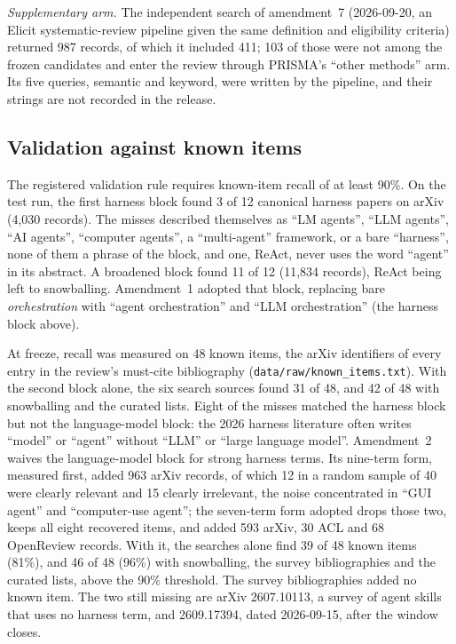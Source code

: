 \emph{Supplementary arm.} The independent search of amendment~7 (2026-09-20, an Elicit
systematic-review pipeline given the same definition and eligibility criteria) returned 987 records,
of which it included 411; 103 of those were not among the frozen candidates and enter the review
through PRISMA's ``other methods'' arm. Its five queries, semantic and keyword, were written by the
pipeline, and their strings are not recorded in the release.

\subsection{Validation against known items}
\label{subsec:search-validation}

The registered validation rule requires known-item recall of at least 90\%. On the test run, the
first harness block found 3 of 12 canonical harness papers on arXiv (4,030 records). The misses
described themselves as ``LM agents'', ``LLM agents'', ``AI agents'', ``computer agents'', a
``multi-agent'' framework, or a bare ``harness'', none of them a phrase of the block, and one, ReAct,
never uses the word ``agent'' in its abstract. A broadened block found 11 of 12 (11,834 records), ReAct
being left to snowballing. Amendment~1 adopted that block, replacing bare \emph{orchestration} with
``agent orchestration'' and ``LLM orchestration'' (the harness block above).

At freeze, recall was measured on 48 known items, the arXiv identifiers of every entry in the review's
must-cite bibliography (\texttt{data/raw/known\_items.txt}). With the second block alone, the six
search sources found 31 of 48, and 42 of 48 with snowballing and the curated lists. Eight of the
misses matched the harness block but not the language-model block: the 2026 harness literature often
writes ``model'' or ``agent'' without ``LLM'' or ``large language model''. Amendment~2 waives the
language-model block for strong harness terms. Its nine-term form, measured first, added 963 arXiv
records, of which 12 in a random sample of 40 were clearly relevant and 15 clearly irrelevant, the
noise concentrated in ``GUI agent'' and ``computer-use agent''; the seven-term form adopted drops those
two, keeps all eight recovered items, and added 593 arXiv, 30 ACL and 68 OpenReview records. With it,
the searches alone find 39 of 48 known items (81\%), and 46 of 48 (96\%) with snowballing, the survey
bibliographies and the curated lists, above the 90\% threshold. The survey bibliographies added no
known item. The two still missing are arXiv 2607.10113, a survey of agent skills that uses no harness
term, and 2609.17394, dated 2026-09-15, after the window closes.
